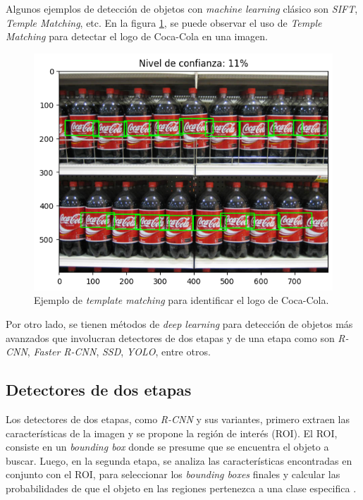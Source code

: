 Algunos ejemplos de detección de objetos con \textit{machine learning} clásico son \textit{SIFT}, \textit{Temple Matching}, etc. En la figura \ref{fig:tempMatch}, se puede observar el uso de \textit{Temple Matching} para detectar el logo de Coca-Cola en una imagen.

\begin{figure}[ht]
	\centering
	\includegraphics[scale=.45]{./Figures/template_match.png}
	\caption{Ejemplo de \textit{template matching} para identificar el logo de Coca-Cola.}
	\label{fig:tempMatch}
\end{figure}

Por otro lado, se tienen métodos de \textit{deep learning} para detección de objetos más avanzados que involucran detectores de dos etapas y de una etapa como son \textit{R-CNN}, \textit{Faster R-CNN}, \textit{SSD}, \textit{YOLO}, entre otros.

\subsection{Detectores de dos etapas}

Los detectores de dos etapas, como \textit{R-CNN} y sus variantes, primero extraen las características de la imagen y se propone la región de interés (ROI). El ROI, consiste en un \textit{bounding box} donde se presume que se encuentra el objeto a buscar. Luego, en la segunda etapa, se analiza las características encontradas en conjunto con el ROI, para seleccionar los \textit{bounding boxes} finales y calcular las probabilidades de que el objeto en las regiones pertenezca a una clase especifica \cite{ARTICLE:8}. 

